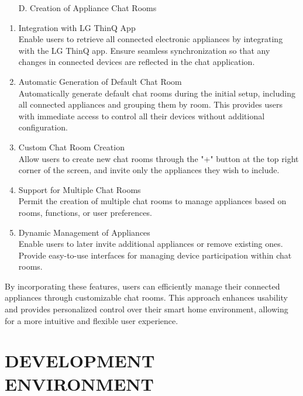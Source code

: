 \documentclass[conference]{IEEEtran}
\begin{document}
\begin{itemize}
    \item [D.] Creation of Appliance Chat Rooms
\end{itemize}

\begin{enumerate}
    \item Integration with LG ThinQ App \\
    Enable users to retrieve all connected electronic appliances by integrating with the LG ThinQ app. Ensure seamless synchronization so that any changes in connected devices are reflected in the chat application.

    \item Automatic Generation of Default Chat Room \\
    Automatically generate default chat rooms during the initial setup, including all connected appliances and grouping them by room. This provides users with immediate access to control all their devices without additional configuration.

    \item Custom Chat Room Creation \\
    Allow users to create new chat rooms through the "+" button at the top right corner of the screen, and invite only the appliances they wish to include.

    \item Support for Multiple Chat Rooms \\
    Permit the creation of multiple chat rooms to manage appliances based on rooms, functions, or user preferences.

    \item Dynamic Management of Appliances \\
    Enable users to later invite additional appliances or remove existing ones. Provide easy-to-use interfaces for managing device participation within chat rooms.
\end{enumerate}

By incorporating these features, users can efficiently manage their connected appliances through customizable chat rooms. This approach enhances usability and provides personalized control over their smart home environment, allowing for a more intuitive and flexible user experience. \\

\section{DEVELOPMENT ENVIRONMENT}
\end{document}
